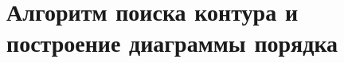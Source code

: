 \documentclass[discrete.tex]{subfiles}
\begin{document}
\section{Алгоритм поиска контура и построение диаграммы порядка}
\end{document}
